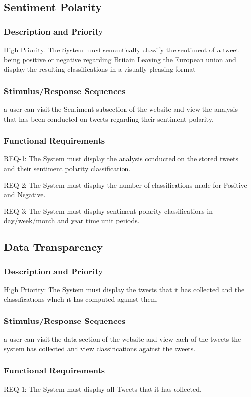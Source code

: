 \documentclass[11pt]{report}
\begin{document}
\subsection*{Sentiment Polarity}
\subsubsection*{Description and Priority}
High Priority: The System must semantically classify the sentiment of a tweet being positive or negative regarding Britain Leaving the European union and display the resulting classifications in a visually pleasing format
\subsubsection*{Stimulus/Response Sequences}
a user can visit the Sentiment subsection of the website and view the analysis that has been conducted on tweets regarding their sentiment polarity.
\subsubsection*{Functional Requirements}
REQ-1:	The System must display the analysis conducted on the stored tweets and their sentiment polarity classification.

REQ-2: The System must display the number of classifications made for Positive and Negative.

REQ-3: The System must display sentiment polarity classifications in day/week/month and year time unit periods.

\subsection*{Data Transparency}
\subsubsection*{Description and Priority}
High Priority: The System must display the tweets that it has collected and the classifications which it has computed against them.
\subsubsection*{Stimulus/Response Sequences}
a user can visit the data section of the website and view each of the tweets the system has collected and view classifications against the tweets.
\subsubsection*{Functional Requirements}
REQ-1: The System must display all Tweets that it has collected.
\end{document}
